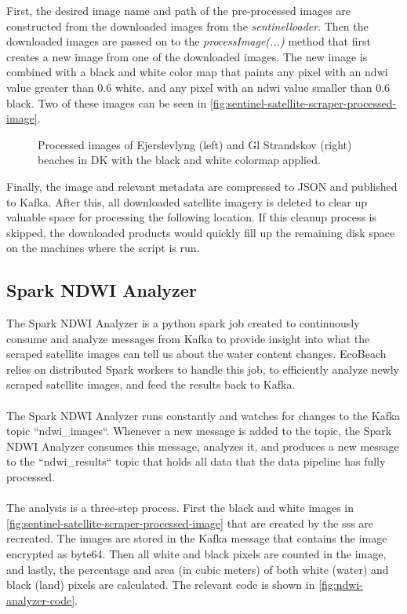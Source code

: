 First, the desired image name and path of the pre-processed images are constructed from the downloaded images from the \emph{sentinelloader}. Then the downloaded images are passed on to the \emph{processImage(...)} method that first creates a new image from one of the downloaded images. The new image is combined with a black and white color map that paints any pixel with an \acrshort{ndwi} value greater than 0.6 white, and any pixel with an \acrshort{ndwi} value smaller than 0.6 black. Two of these images can be seen in \autoref{fig:sentinel-satellite-scraper-processed-image}.

\begin{figure}[h!]
    \centering
    \caption{Processed images of Ejerslevlyng (left) and Gl Strandskov (right) beaches in DK with the black and white colormap applied.}
    \label{fig:sentinel-satellite-scraper-processed-image}
\end{figure}

Finally, the image and relevant metadata are compressed to JSON and published to Kafka. After this, all downloaded satellite imagery is deleted to clear up valuable space for processing the following location. If this cleanup process is skipped, the downloaded products would quickly fill up the remaining disk space on the machines where the script is run.

\subsection{Spark NDWI Analyzer}\label{subsec:ndwi-analyzer}

The Spark NDWI Analyzer is a python spark job created to continuously consume and analyze messages from Kafka to provide insight into what the scraped satellite images can tell us about the water content changes. EcoBeach relies on distributed Spark workers to handle this job, to efficiently analyze newly scraped satellite images, and feed the results back to Kafka.\\\\
\noindent
The Spark NDWI Analyzer runs constantly and watches for changes to the Kafka topic ``ndwi\_images``. Whenever a new message is added to the topic, the Spark NDWI Analyzer consumes this message, analyzes it, and produces a new message to the ``ndwi\_results`` topic that holds all data that the data pipeline has fully processed.\\\\
\noindent
The analysis is a three-step process. First the black and white images in \autoref{fig:sentinel-satellite-scraper-processed-image} that are created by the \acrshort{sss} are recreated. The images are stored in the Kafka message that contains the image encrypted as byte64. Then all white and black pixels are counted in the image, and lastly, the percentage and area (in cubic meters) of both white (water) and black (land) pixels are calculated. The relevant code is shown in \autoref{fig:ndwi-analyzer-code}.

